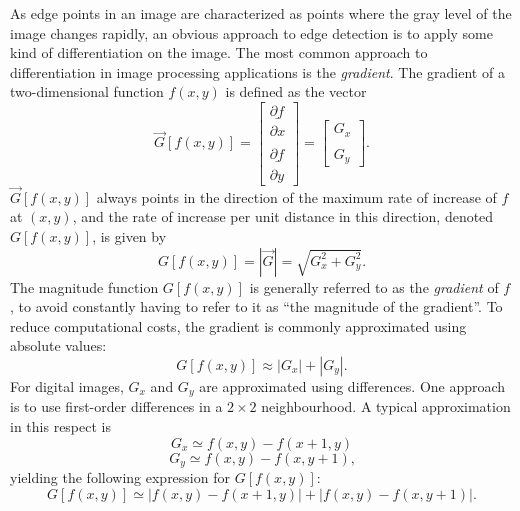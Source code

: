 As edge points in an image are characterized as points where the gray
level of the image changes rapidly, an obvious approach to edge
detection is to apply some kind of differentiation on the image.  The
most common approach to differentiation in image processing
applications is the {\em gradient\/}.  The gradient of a
two-dimensional function $f(x,y)$ is defined as the vector
\begin{equation}
  \vec{G}[f(x,y)]=\left[
    \begin{array}{c}
      \underline{\partial f} \\
      \partial x \\ \\
      \underline{\partial f} \\
      \partial y
    \end{array}\right]=\left[
    \begin{array}{c}
      G_{x} \\ \\
      G_{y}
    \end{array}\right]\mbox{.}
\end{equation}
$\vec{G}[f(x,y)]$ always points in the direction of the maximum rate
of increase of $f$ at $(x,y)$, and the rate of increase per unit
distance in this direction, denoted $G[f(x,y)]$, is given by
\begin{equation}
\label{eq:gradient:sqrt}
  G[f(x,y)]=|\vec{G}|=\sqrt{G_{x}^{2}+G_{y}^{2}}\mbox{.}
\end{equation}
The magnitude function $G[f(x,y)]$ is generally referred to as the
{\em gradient\/} of $f$, to avoid constantly having to refer to it as
``the magnitude of the gradient''.  To reduce computational costs, the
gradient is commonly approximated using absolute values:
\begin{equation}
\label{eq:gradient:abs}
  G[f(x,y)]\approx|G_{x}|+|G_{y}|\mbox{.}
\end{equation}
For digital images, $G_{x}$ and $G_{y}$ are approximated using
differences.  One approach is to use first-order differences in a
$2\times 2$ neighbourhood.  A typical approximation in this respect is
\begin{equation}
  G_{x}\simeq f(x,y)-f(x+1,y)
\end{equation}
\begin{equation}
  G_{y}\simeq f(x,y)-f(x,y+1)\mbox{,}
\end{equation}
yielding the following expression for $G[f(x,y)]$:
\begin{equation}
\label{eq:gradient:simple}
  G[f(x,y)]\simeq|f(x,y)-f(x+1,y)|+|f(x,y)-f(x,y+1)|\mbox{.}
\end{equation}
